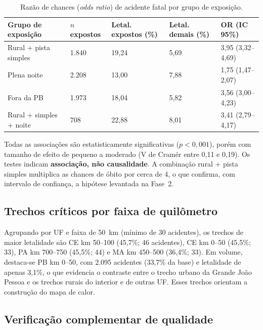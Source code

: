 \documentclass[11pt,a4paper]{article}
\begin{document}
\begin{table}[H]
  \centering
  \small
  \renewcommand{\arraystretch}{1.2}
  \caption{Razão de chances (\textit{odds ratio}) de acidente fatal por grupo de exposição.}
  \label{tab:odds}
  \begin{tabularx}{\textwidth}{|L|Y|Y|Y|Y|}
    \hline
    \textbf{Grupo de exposição} & \textbf{$n$ expostos} & \textbf{Letal. expostos (\%)} & \textbf{Letal. demais (\%)} & \textbf{OR (IC 95\%)} \\
    \hline
    Rural + pista simples & 1.840 & 19,24 & 5,69 & 3,95 (3,32--4,69) \\
    \hline
    Plena noite & 2.208 & 13,00 & 7,88 & 1,75 (1,47--2,07) \\
    \hline
    Fora da PB & 1.973 & 18,04 & 5,82 & 3,56 (3,00--4,23) \\
    \hline
    Rural + simples + noite & 708 & 22,88 & 8,01 & 3,41 (2,79--4,17) \\
    \hline
  \end{tabularx}
\end{table}

Todas as associações são estatisticamente significativas ($p<0,001$), porém com tamanho de efeito de pequeno a moderado (V de Cramér entre 0,11 e 0,19). Os testes indicam \textbf{associação, não causalidade}. A combinação rural + pista simples multiplica as chances de óbito por cerca de 4, o que confirma, com intervalo de confiança, a hipótese levantada na Fase~2.

\subsection{Trechos críticos por faixa de quilômetro}

Agrupando por UF e faixa de 50~km (mínimo de 30 acidentes), os trechos de maior letalidade são CE km 50--100 (45,7\%; 46 acidentes), CE km 0--50 (45,5\%; 33), PA km 700--750 (45,5\%; 44) e MA km 450--500 (36,4\%; 33). Em volume, destaca-se PB km 0--50, com 2.095 acidentes (33,7\% da base) e letalidade de apenas 3,1\%, o que evidencia o contraste entre o trecho urbano da Grande João Pessoa e os trechos rurais do interior e de outras UF. Esses trechos orientam a construção do mapa de calor.

\subsection{Verificação complementar de qualidade}
\end{document}
